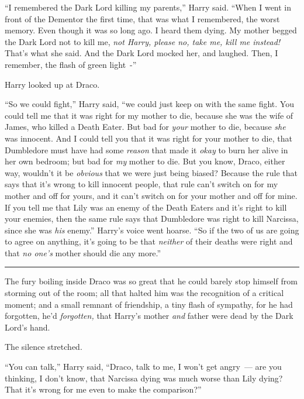 ``I remembered the Dark Lord killing my parents,'' Harry said. ``When I went in front of the Dementor the first time, that was what I remembered, the worst memory. Even though it was so long ago. I heard them dying. My mother begged the Dark Lord not to kill me, \emph{not Harry, please no, take me, kill me instead!} That's what she said. And the Dark Lord mocked her, and laughed. Then, I remember, the flash of green light~-''

Harry looked up at Draco.

``So we could fight,'' Harry said, ``we could just keep on with the same fight. You could tell me that it was right for my mother to die, because she was the wife of James, who killed a Death Eater. But bad for \emph{your} mother to die, because \emph{she} was innocent. And I could tell you that it was right for your mother to die, that Dumbledore must have had some \emph{reason} that made it \emph{okay} to burn her alive in her own bedroom; but bad for \emph{my} mother to die. But you know, Draco, either way, wouldn't it be \emph{obvious} that we were just being biased? Because the rule that says that it's wrong to kill innocent people, that rule can't switch on for my mother and off for yours, and it can't switch on for your mother and off for mine. If you tell me that Lily was an enemy of the Death Eaters and it's right to kill your enemies, then the same rule says that Dumbledore was right to kill Narcissa, since she was \emph{his} enemy.'' Harry's voice went hoarse. ``So if the two of us are going to agree on anything, it's going to be that \emph{neither} of their deaths were right and that \emph{no one's} mother should die any more.''

\begin{center}\rule{3in}{0.4pt}\end{center}

The fury boiling inside Draco was so great that he could barely stop himself from storming out of the room; all that halted him was the recognition of a critical moment; and a small remnant of friendship, a tiny flash of sympathy, for he had forgotten, he'd \emph{forgotten,} that Harry's mother \emph{and} father were dead by the Dark Lord's hand.

The silence stretched.

``You can talk,'' Harry said, ``Draco, talk to me, I won't get angry~--- are you thinking, I don't know, that Narcissa dying was much worse than Lily dying? That it's wrong for me even to make the comparison?''

